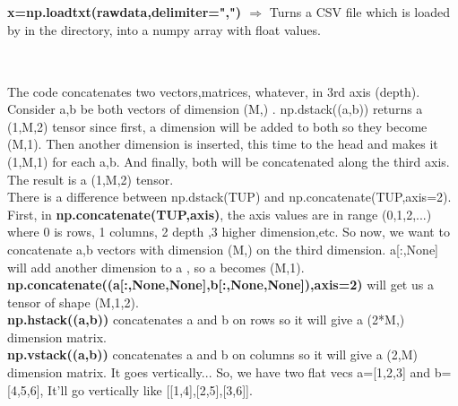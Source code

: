 \documentclass[a4paper,18pt]{article}
\begin{document}
\subsection{\colorbox {matgreen}{\color{white}{\large np.loadtxt(rawdata,delimiter=",")}}}
\textbf{x=np.loadtxt(rawdata,delimiter=",") $\Rightarrow$} Turns a CSV file which is loaded by {\colorbox{matgreen}{\color{white}{open(filename,'rt')}}} in the directory, into a numpy array with float values.\\\\


\subsection{\colorbox {matgreen}{\color{white}{\large np.dstack(TUP)}}}
The code concatenates two vectors,matrices, whatever, in 3rd axis (depth). Consider a,b be both vectors of dimension (M,) . np.dstack((a,b)) returns a (1,M,2) tensor since first, a dimension will be added to both so they become (M,1). Then another dimension is inserted, this time to the head and makes it (1,M,1) for each a,b. And finally, both will be concatenated along the third axis. The result is a (1,M,2) tensor.\\

There is a difference between np.dstack(TUP) and np.concatenate(TUP,axis=2). First, in \textbf{np.concatenate(TUP,axis)}, the axis values are in range (0,1,2,...) where 0 is rows, 1 columns, 2 depth ,3 higher dimension,etc. So now, we want to concatenate a,b vectors with dimension (M,) on the third dimension. a[:,None] will add another dimension to a , so a becomes (M,1).  \textbf{np.concatenate((a[:,None,None],b[:,None,None]),axis=2)} will get us a tensor of shape (M,1,2).\\

\textbf{np.hstack((a,b))} concatenates a and b on rows so it will give a (2*M,) dimension matrix.\\

\textbf{np.vstack((a,b))} concatenates a and b on columns so it will give a (2,M) dimension matrix. It goes vertically... So, we have two flat vecs a=[1,2,3] and b=[4,5,6],
It'll go vertically like [[1,4],[2,5],[3,6]].\\\\

\end{document}
